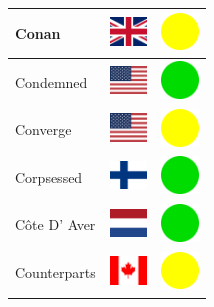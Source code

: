 \documentclass[12pt, a4paper, twoside]{report}
\begin{document}
\begin{center}
\begin{longtable}{|p{5cm}|p{2cm}|p{2cm}|}
Conan & \includegraphics[width=1cm]{4x3/gb} & \includegraphics[width=1cm]{likes/m} \\ \hline
Condemned & \includegraphics[width=1cm]{4x3/us} & \includegraphics[width=1cm]{likes/y} \\ \hline
Converge & \includegraphics[width=1cm]{4x3/us} & \includegraphics[width=1cm]{likes/m} \\ \hline
Corpsessed & \includegraphics[width=1cm]{4x3/fi} & \includegraphics[width=1cm]{likes/y} \\ \hline
Côte D' Aver & \includegraphics[width=1cm]{4x3/nl} & \includegraphics[width=1cm]{likes/y} \\ \hline
Counterparts & \includegraphics[width=1cm]{4x3/ca} & \includegraphics[width=1cm]{likes/m} \\ \hline

\end{longtable}
\end{center}
\end{document}
